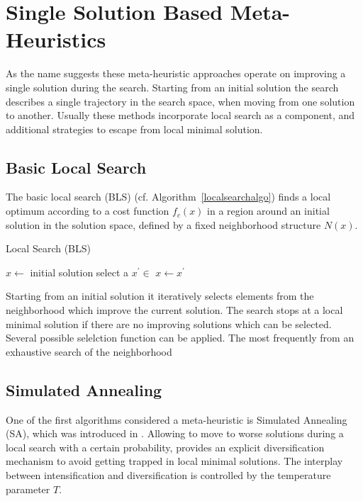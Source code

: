  
\section{Single Solution Based Meta-Heuristics}
As the name suggests these meta-heuristic approaches operate on improving a single solution during the search. 
Starting from an initial solution the search describes a single trajectory in the search space, when moving from one solution to another. 
Usually these methods incorporate local search as a component, and additional strategies to escape from local minimal solution.  

\subsection{Basic Local Search}
The basic local search (BLS) (cf. Algorithm~\ref{localsearchalgo}) finds a local optimum according to a cost function $f_c(x)$ in a region around an initial solution in the solution space, defined by a fixed neighborhood structure $N(x)$. 


\begin{algorithm}
\caption{Local Search  (BLS)}
\label{localsearchalgo}
\begin{algorithmic}[1] 
\State $x\gets$ initial solution
\Repeat
\State select a $x^\prime \in$ 
    \State $x\gets x^\prime$
\EndIf
{}
\end{algorithmic}
\end{algorithm}

Starting from an initial solution it iteratively selects elements from the neighborhood which improve the current solution. The search stops at a local minimal solution if there are no improving solutions which can be selected.
Several possible selelction function can be applied. The most frequently from an exhaustive search of the neighborhood 



\subsection{Simulated Annealing}
One of the first algorithms considered a meta-heuristic is Simulated Annealing (SA), which was introduced in \cite{Kirkpatrick83SimulatedAnnealing}. 
Allowing to move to worse solutions during a local search with a certain probability, provides an explicit diversification mechanism to avoid getting trapped in local minimal solutions.
The interplay between intensification and diversification is controlled by the temperature  parameter $T$. 


